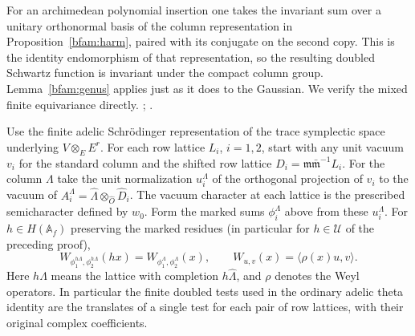 For an archimedean polynomial insertion one takes the invariant
sum over a unitary orthonormal basis of the column representation
in Proposition~\ref{bfam:harm}, paired with its conjugate on
the second copy. This is the identity endomorphism of that
representation, so the resulting doubled Schwartz function is
invariant under the compact column group. Lemma~\ref{bfam:genus}
applies just as it does to the Gaussian. We verify the mixed
finite equivariance directly.
;
.

\begin{lemma}\label{bfam:phase}
Use the finite adelic Schrödinger representation of the trace
symplectic space underlying \(V\otimes_E E^r\). For each row
lattice \(L_i\), \(i=1,2\), start with any unit vacuum \(v_i\) for
the standard column and the shifted row lattice
\(D_i=\mathfrak m\bar{\mathfrak m}^{-1}L_i\). For the column
\(\Lambda\) take the unit normalization \(u_i^\Lambda\) of the
orthogonal projection of \(v_i\) to the vacuum of
\(A_i^\Lambda=\widehat\Lambda\otimes_{\widehat O}\widehat D_i\).
The vacuum character at each lattice is the prescribed
semicharacter defined by \(w_0\). Form the marked sums
\(\phi_i^\Lambda\) above from these \(u_i^\Lambda\). For
\(h\in H(\mathbb A_f)\) preserving the marked residues (in
particular for \(h\in\mathcal U\) of the preceding proof),
\[
 W_{\phi_1^{h\Lambda},\phi_2^{h\Lambda}}(hx)
       =W_{\phi_1^\Lambda,\phi_2^\Lambda}(x),\qquad
 W_{u,v}(x)=\langle \rho(x)u,v\rangle .
\]
Here \(h\Lambda\) means the lattice with completion
\(h\widehat\Lambda\), and \(\rho\) denotes the Weyl operators.
In particular the finite doubled tests used in the ordinary
adelic theta identity are the translates of a single test for
each pair of row lattices, with their original complex coefficients.
\end{lemma}
